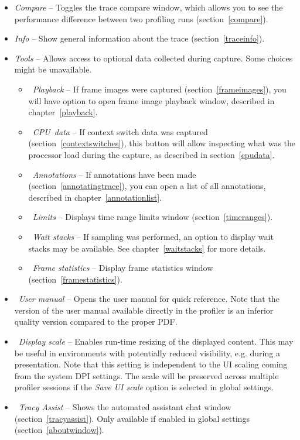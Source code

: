 \documentclass[hidelinks,titlepage,a4paper,twoside]{article}
\begin{document}
\begin{itemize}
\item \emph{\faScaleBalanced{} Compare} -- Toggles the trace compare window, which allows you to see the performance difference between two profiling runs (section~\ref{compare}).
\item \emph{\faFingerprint{} Info} -- Show general information about the trace (section~\ref{traceinfo}).
\item \emph{\faScrewdriverWrench{} Tools} -- Allows access to optional data collected during capture. Some choices might be unavailable.
\begin{itemize}
\item \emph{\faPlay{}~Playback} -- If frame images were captured (section~\ref{frameimages}), you will have option to open frame image playback window, described in chapter~\ref{playback}.
\item \emph{\faSliders{}~CPU~data} -- If context switch data was captured (section~\ref{contextswitches}), this button will allow inspecting what was the processor load during the capture, as described in section~\ref{cpudata}.
\item \emph{\faNoteSticky{}~Annotations} -- If annotations have been made (section~\ref{annotatingtrace}), you can open a list of all annotations, described in chapter~\ref{annotationlist}.
\item \emph{\faRuler{}~Limits} -- Displays time range limits window (section~\ref{timeranges}).
\item \emph{\faHourglassHalf{}~Wait stacks} -- If sampling was performed, an option to display wait stacks may be available. See chapter~\ref{waitstacks} for more details.
\item \emph{\faImages{}~Frame statistics} -- Display frame statistics window (section~\ref{framestatistics}).
\end{itemize}
\item \emph{ \faBook{}~User manual} -- Opens the user manual for quick reference. Note that the version of the user manual available directly in the profiler is an inferior quality version compared to the proper PDF.
\item \emph{\faMagnifyingGlassPlus{}~Display scale} -- Enables run-time resizing of the displayed content. This may be useful in environments with potentially reduced visibility, e.g. during a presentation. Note that this setting is independent to the UI scaling coming from the system DPI settings. The scale will be preserved across multiple profiler sessions if the \emph{Save UI scale} option is selected in global settings.
\item \emph{\faRobot{}~Tracy Assist} -- Shows the automated assistant chat window (section~\ref{tracyassist}). Only available if enabled in global settings (section~\ref{aboutwindow}).
\end{itemize}
\end{document}
